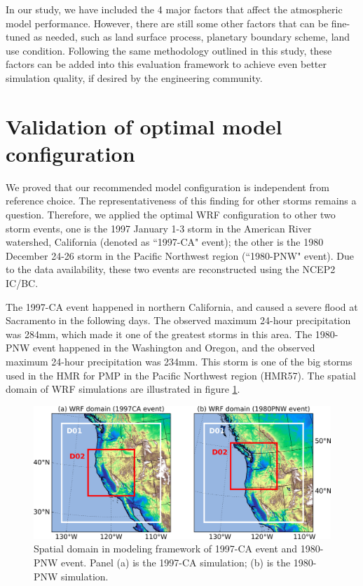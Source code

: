 In our study, we have included the 4 major factors that affect the atmospheric model performance. However, there are still some other factors that can be fine-tuned as needed, such as land surface process, planetary boundary scheme, land use condition. Following the same methodology outlined in this study, these factors can be added into this evaluation framework to achieve even better simulation quality, if desired by the engineering community.

\section{Validation of optimal model configuration}

We proved that our recommended model configuration is independent from reference choice. The representativeness of this finding for other storms remains a question. Therefore, we applied the optimal WRF configuration to other two storm events, one is the 1997 January 1-3 storm in the American River watershed, California (denoted as ``1997-CA" event); the other is the 1980 December 24-26 storm in the Pacific Northwest region (``1980-PNW" event). Due to the data availability, these two events are reconstructed using the NCEP2 IC/BC.

The 1997-CA event happened in northern California, and caused a severe flood at Sacramento in the following days. The observed maximum 24-hour precipitation was 284mm, which made it one of the greatest storms in this area. The 1980-PNW event happened in the Washington and Oregon, and the observed maximum 24-hour precipitation was 234mm. This storm is one of the big storms used in the HMR for PMP in the Pacific Northwest region (HMR57). The spatial domain of WRF simulations are illustrated in figure \ref{fig:2-S1}.

\begin{figure}[htbp]
  \includegraphics[width=\linewidth]{pics/ch2/figS_2events.png}
  \caption{Spatial domain in modeling framework of 1997-CA event and 1980-PNW event. Panel (a) is the 1997-CA simulation; (b) is the 1980-PNW simulation.}
  \label{fig:2-S1}
\end{figure}


